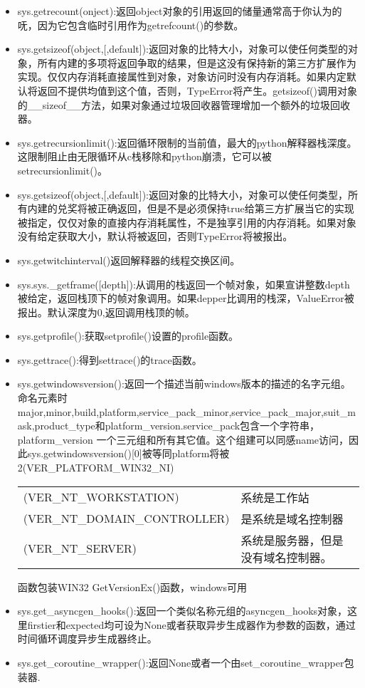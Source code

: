 \begin{itemize}
\item sys.getrecount(onject):返回object对象的引用返回的储量通常高于你认为的呒，因为它包含临时引用作为getrefcount()的参数。
\item sys.getsizeof(object,[,default]):返回对象的比特大小，对象可以使任何类型的对象，所有内建的多项将返回争取的结果，但是这没有保持新的第三方扩展作为实现。仅仅内存消耗直接属性到对象，对象访问时没有内存消耗。如果内定默认将返回不提供均值到这个值，否则，TypeError将产生。getsizeof()调用对象的\_\_sizeof\_\_方法，如果对象通过垃圾回收器管理增加一个额外的垃圾回收器。
\item sys.getrecursionlimit():返回循环限制的当前值，最大的python解释器栈深度。这限制阻止由无限循环从c栈移除和python崩溃，它可以被setrecursionlimit()。
\item sys.getsizeof(object,[,default]):返回对象的比特大小，对象可以使任何类型，所有内建的兑奖将被正确返回，但是不是必须保持true给第三方扩展当它的实现被指定，仅仅对象的直接内存消耗属性，不是独享引用的内存消耗。如果对象没有给定获取大小，默认将被返回，否则TypeError将被报出。
\item sys.getwitchinterval()返回解释器的线程交换区间。
\item sys.sys.\_getframe([depth]):从调用的栈返回一个帧对象，如果宣讲整数depth被给定，返回栈顶下的帧对象调用。如果depper比调用的栈深，ValueError被报出。默认深度为0,返回调用栈顶的帧。
\item sys.getprofile():获取setprofile()设置的profile函数。
\item sys.gettrace():得到settrace()的trace函数。
\item sys.getwindowsversion():返回一个描述当前windows版本的描述的名字元组。命名元素时major,minor,build,platform,service\_pack\_minor,service\_pack\_major,suit\_mask,product\_type和platform\_version.service\_pack包含一个字符串，platform\_version 一个三元组和所有其它值。这个组建可以同感name访问，因此sys.getwindowsversion()[0]被等同platform将被2(VER\_PLATFORM\_WIN32\_NI)
\begin{tabular}{ll}
(VER\_NT\_WORKSTATION)&系统是工作站\\
(VER\_NT\_DOMAIN\_CONTROLLER)&是系统是域名控制器\\
(VER\_NT\_SERVER)&系统是服务器，但是没有域名控制器。
\end{tabular}
函数包装WIN32 GetVersionEx()函数，windows可用
\item sys.get\_asyncgen\_hooks():返回一个类似名称元组的asyncgen\_hooks对象，这里firstier和expected均可设为None或者获取异步生成器作为参数的函数，通过时间循环调度异步生成器终止。
\item sys.get\_coroutine\_wrapper():返回None或者一个由set\_coroutine\_wrapper包装器.

\end{itemize}
